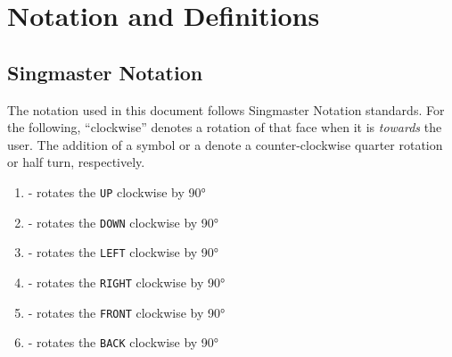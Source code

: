 \documentclass{report}
\newcommand{\tit}[1]{\textit{#1}}
\newcommand{\movegroup}[1]{\uppercase{\texttt{\formatmoves{#1}}}}
\begin{document}
	\newpage
	\chapter{Notation and Definitions}
	
	\section*{Singmaster Notation}
	
	The notation used in this document follows Singmaster Notation standards. For the following, \enquote{clockwise} denotes a rotation of that face when it is \tit{towards} the user. The addition of a \movegroup{@} symbol or a \movegroup{"} denote a counter-clockwise quarter rotation or half turn, respectively.
	
	\begin{enumerate}
		\item[] \movegroup{u} - rotates the \lstinline|UP| clockwise by \ang{90}
		\item[] \movegroup{d} - rotates the \lstinline|DOWN| clockwise by \ang{90}
		\item[] \movegroup{l} - rotates the \lstinline|LEFT| clockwise by \ang{90}
		\item[] \movegroup{r} - rotates the \lstinline|RIGHT| clockwise by \ang{90}
		\item[] \movegroup{f} - rotates the \lstinline|FRONT| clockwise by \ang{90}
		\item[] \movegroup{b} - rotates the \lstinline|BACK| clockwise by \ang{90}
	\end{enumerate}
	
\end{document}
